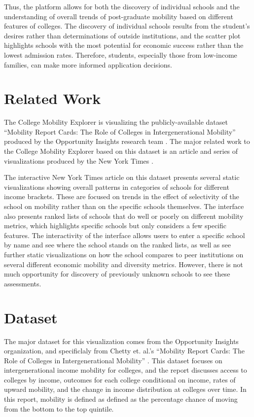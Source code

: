 \documentclass{vgtc}
\begin{document}
Thus, the platform allows for both the discovery of individual schools and the understanding of overall trends of post-graduate mobility based on different features of colleges. The discovery of individual schools results from the student’s desires rather than determinations of outside institutions, and the scatter plot highlights schools with the most potential for economic success rather than the lowest admission rates. Therefore, students, especially those from low-income families, can make more informed application decisions.

\section{Related Work}
The College Mobility Explorer is visualizing the publicly-available dataset ``Mobility Report Cards: The Role of Colleges in Intergenerational Mobility'' produced by the Opportunity Insights research team \cite{mobility}. The major related work to the College Mobility Explorer based on this dataset is an article and series of visualizations produced by the New York Times \cite{gregor_aisch_2017}.

The interactive New York Times article on this dataset presents several static visualizations showing overall patterns in categories of schools for different income brackets. These are focused on trends in the effect of selectivity of the school on mobility rather than on the specific schools themselves. The interface also presents ranked lists of schools that do well or poorly on different mobility metrics, which highlights specific schools but only considers a few specific features. The interactivity of the interface allows users to enter a specific school by name and see where the school stands on the ranked lists, as well as see further static visualizations on how the school compares to peer institutions on several different economic mobility and diversity metrics. However, there is not much opportunity for discovery of previously unknown schools to see these assessments.

\section{Dataset}
The major dataset for this visualization comes from the Opportunity Insights organization, and  specificlaly from Chetty et. al.'s ``Mobility Report Cards: The Role of Colleges in Intergenerational Mobility'' \cite{mobility} . This dataset focuses on intergenerational income mobility for colleges, and the report discusses access to colleges by income, outcomes for each college conditional on income, rates of upward mobility, and the change in income distribution at colleges over time. In this report, mobility is defined as defined as the percentage chance of moving from the bottom to the top quintile.
\end{document}
